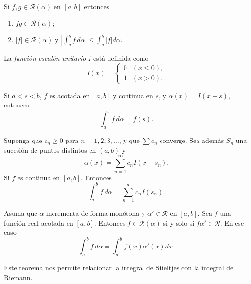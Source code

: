 \documentclass[10pt]{beamer}
\begin{document}
\begin{frame}

\begin{theorem}[9]
Si $f, g \in \mathcal{R}(\alpha)$ en $[a, b]$ entonces
\begin{enumerate}
	\item $fg \in \mathcal{R}(\alpha)$;
	\item $|f| \in \mathcal{R}(\alpha)$ y $\left|\int_a^b f\,d\alpha\right| \leq \int_a^b |f| d\alpha$.
\end{enumerate}
\end{theorem}

\begin{definition}
La \textit{función escalón unitario} $I$ está definida como
\[
	I(x) = \begin{cases}
		0 & (x \leq 0),\\
		1 & (x > 0).
	\end{cases}
\]
\end{definition}
\end{frame}

\begin{frame}
\begin{theorem}[10]
Si $a < s < b$, $f$ es acotada en $[a, b]$ y continua en $s$, y $\alpha(x) = I(x-s)$, entonces
\[
	\int_a^b f\,d\alpha = f(s).
\]
\end{theorem}
\end{frame}

\begin{frame}
\begin{theorem}[11]
Suponga que $c_n \geq 0$ para $n = 1, 2, 3, \dots$, y que $\sum c_n$ converge. Sea además ${S_n}$ una sucesión de puntos distintos en $(a, b)$ y
\begin{equation}
	\alpha(x) = \sum_{n=1}^{\infty} c_n I(x-s_n).
\end{equation}
Si $f$ es continua en $[a, b]$. Entonces
\begin{equation}
	\int_a^b f\,d\alpha = \sum_{n=1}^{\infty} c_n f(s_n).
\end{equation}
\end{theorem}
\end{frame}

\begin{frame}
\begin{theorem}[12]
Asuma que $\alpha$ incrementa de forma monótona  y $\alpha' \in \mathcal{R}$ en $[a, b]$. Sea $f$ una función real acotada en $[a, b]$.
Entonces $f \in \mathcal{R}(\alpha)$ si y solo si $f\alpha' \in \mathcal{R}$. En ese caso
\begin{equation}
	\int_a^b f\,d\alpha = \int_a^b f(x)\alpha'(x) dx.
\end{equation}
\end{theorem}

Este teorema nos permite relacionar la integral de Stieltjes con la integral de Riemann.
\end{frame}
\end{document}
